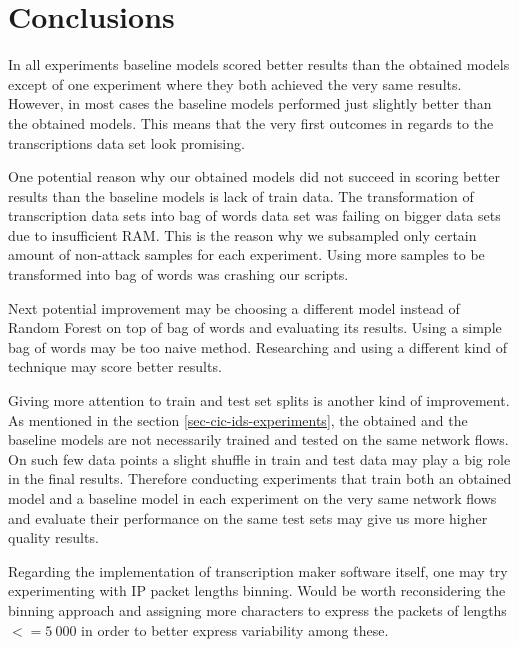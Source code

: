 \documentclass{article}
\begin{document}
\clearpage
\section{Conclusions}
In all experiments baseline models scored better results than the obtained models except of one experiment where they both achieved the very same results. However, in most cases the baseline models performed just slightly better than the obtained models. This means that the very first outcomes in regards to the transcriptions data set look promising.

One potential reason why our obtained models did not succeed in scoring better results than the baseline models is lack of train data. The transformation of transcription data sets into bag of words data set was failing on bigger data sets due to insufficient RAM. This is the reason why we subsampled only certain amount of non-attack samples for each experiment. Using more samples to be transformed into bag of words was crashing our scripts.

Next potential improvement may be choosing a different model instead of Random Forest on top of bag of words and evaluating its results. Using a simple bag of words may be too naive method. Researching and using a different kind of technique may score better results.

Giving more attention to train and test set splits is another kind of improvement. As mentioned in the section \ref{sec-cic-ids-experiments}, the obtained and the baseline models are not necessarily trained and tested on the same network flows. On such few data points a slight shuffle in train and test data may play a big role in the final results. Therefore conducting experiments that train both an obtained model and a baseline model in each experiment on the very same network flows and evaluate their performance on the same test sets may give us more higher quality results.

Regarding the implementation of transcription maker software itself, one may try experimenting with IP packet lengths binning. Would be worth reconsidering the binning approach and assigning more characters to express the packets of lengths $<= 5\ 000$ in order to better express variability among these.


\clearpage




% 

\end{document}
